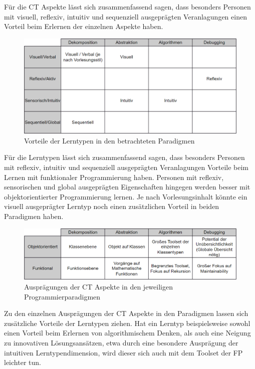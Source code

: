 Für die CT Aspekte lässt sich zusammenfassend sagen, dass besonders Personen mit visuell, reflexiv, intuitiv und sequenziell ausgeprägten Veranlagungen einen Vorteil beim Erlernen der einzelnen Aspekte haben.

\begin{figure}[H]
    \centering
    \includegraphics[width=1\linewidth]{Figures/Section_3/Styles_Paradigms}
    \caption{Vorteile der Lerntypen in den betrachteten Paradigmen}
\end{figure}

Für die Lerntypen lässt sich zusammenfassend sagen, dass besonders Personen mit reflexiv, intuitiv und sequenziell ausgeprägten Veranlagungen Vorteile beim Lernen mit funktionaler Programmierung haben.
Personen mit reflexiv, sensorischen und global ausgeprägten Eigenschaften hingegen werden besser mit objektorientierter Programmierung lernen.
Je nach Vorlesungsinhalt könnte ein visuell ausgeprägter Lerntyp noch einen zusätzlichen Vorteil in beiden Paradigmen haben.

\begin{figure}[H]
    \centering
    \includegraphics[width=1\linewidth]{Figures/Section_3/CT_Paradigms}
    \caption{Ausprägungen der CT Aspekte in den jeweiligen Programmierparadigmen}
\end{figure}

Zu den einzelnen Ausprägungen der CT Aspekte in den Paradigmen lassen sich zusätzliche Vorteile der Lerntypen ziehen.
Hat ein Lerntyp beispielsweise sowohl einen Vorteil beim Erlernen von algorithmischem Denken, als auch eine Neigung zu innovativen Lösungsansätzen, etwa durch eine besondere Ausprägung der intuitiven Lerntypendimension, wird dieser sich auch mit dem Toolset der FP leichter tun.

